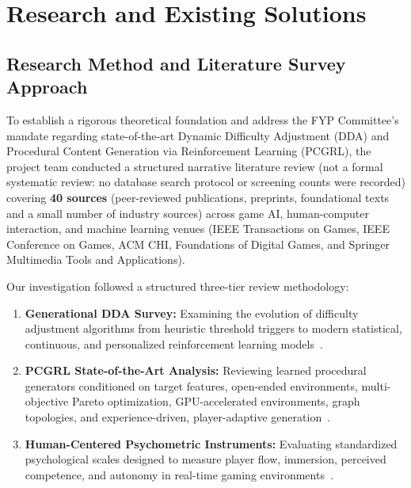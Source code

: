 \chapter{Research and Existing Solutions}
\label{chap:research}

\section{Research Method and Literature Survey Approach}
To establish a rigorous theoretical foundation and address the FYP Committee's mandate regarding state-of-the-art Dynamic Difficulty Adjustment (DDA) and Procedural Content Generation via Reinforcement Learning (PCGRL), the project team conducted a structured narrative literature review (not a formal systematic review: no database search protocol or screening counts were recorded) covering \textbf{40 sources} (peer-reviewed publications, preprints, foundational texts and a small number of industry sources) across game AI, human-computer interaction, and machine learning venues (IEEE Transactions on Games, IEEE Conference on Games, ACM CHI, Foundations of Digital Games, and Springer Multimedia Tools and Applications).

Our investigation followed a structured three-tier review methodology:
\begin{enumerate}
    \item \textbf{Generational DDA Survey:} Examining the evolution of difficulty adjustment algorithms from heuristic threshold triggers to modern statistical, continuous, and personalized reinforcement learning models~\cite{mortazavi2024dda, zohaib2018dynamic, fisher2024exploring, pfau2020enemy, fuchs2024personalized, rahim2023continuous, romeo2025ntrl, xue2017dynamic}.
    \item \textbf{PCGRL State-of-the-Art Analysis:} Reviewing learned procedural generators conditioned on target features, open-ended environments, multi-objective Pareto optimization, GPU-accelerated environments, graph topologies, and experience-driven, player-adaptive generation~\cite{khalifa2020pcgrl, earle2021illuminating, earle2021controllable, yuan2026mopcgrl, li2025measuring, bazzaz2026imitation, earle2024pcgrlplus, rupp2024gpcgrl, yannakakis2018ai, yannakakis2011experience, shaker2010personalized, shu2021edrl, wang2022oparl}.
    \item \textbf{Human-Centered Psychometric Instruments:} Evaluating standardized psychological scales designed to measure player flow, immersion, perceived competence, and autonomy in real-time gaming environments~\cite{csikszentmihalyi1990flow, denisova2016convergence, tyack2020sdt, michailidis2018flow}.
\end{enumerate}

